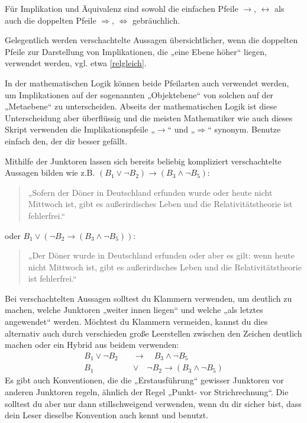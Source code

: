 	
\begin{bem}
    Für Implikation und Äquivalenz sind sowohl die einfachen Pfeile $\to$, $\leftrightarrow$ als auch die doppelten Pfeile $\Rightarrow$, $\Leftrightarrow$ gebräuchlich.
    
    Gelegentlich werden verschachtelte Aussagen übersichtlicher, wenn die doppelten Pfeile zur Darstellung von Implikationen, die „eine Ebene höher“ liegen, verwendet werden, vgl. etwa \cref{relgleich}.
    
    In der mathematischen Logik können beide Pfeilarten auch verwendet werden, um Implikationen auf der sogenannten „Objektebene“ von solchen auf der „Metaebene“ zu unterscheiden. Abseits der mathematischen Logik ist diese Unterscheidung aber überflüssig und die meisten Mathematiker wie auch dieses Skript verwenden die Implikationspfeile „$\to$“ und „$\Rightarrow$“ synonym. Benutze einfach den, der dir besser gefällt.
\end{bem}

	
\begin{bem}
    Mithilfe der Junktoren lassen sich bereits beliebig kompliziert verschachtelte Aussagen bilden wie z.B. $(B_1\lor \neg B_2) \to (B_3\land \neg B_5)$:
    \begin{quote}
        „Sofern der Döner in Deutschland erfunden wurde oder heute nicht Mittwoch ist, gibt es außerirdisches Leben und die Relativitätstheorie ist fehlerfrei.“
    \end{quote}
    oder $B_1\lor (\neg B_2 \to (B_3\land \neg B_5))$:
    \begin{quote}
        „Der Döner wurde in Deutschland erfunden oder aber es gilt: wenn heute nicht Mittwoch ist, gibt es außerirdisches Leben und die Relativitätstheorie ist fehlerfrei.“
    \end{quote}
    Bei verschachtelten Aussagen solltest du Klammern verwenden, um deutlich zu machen, welche Junktoren „weiter innen liegen“ und welche „als letztes angewendet“ werden. Möchtest du Klammern vermeiden, kannst du dies alternativ auch durch verschieden große Leerstellen zwischen den Zeichen deutlich machen oder ein Hybrid aus beidem verwenden:
    \begin{align*}
        B_1\lor \neg B_2\quad &\to \quad B_3\land \neg B_5 \\[0.5em]
        B_1\quad  &\lor \quad \neg B_2 \to (B_3\land \neg B_5)
    \end{align*}
    Es gibt auch Konventionen, die die „Erstausführung“ gewisser Junktoren vor anderen Junktoren regeln, ähnlich der Regel „Punkt- vor Strichrechnung“. Die solltest du aber nur dann stillschweigend verwenden, wenn du dir sicher bist, dass dein Leser dieselbe Konvention auch kennt und benutzt.
\end{bem}


